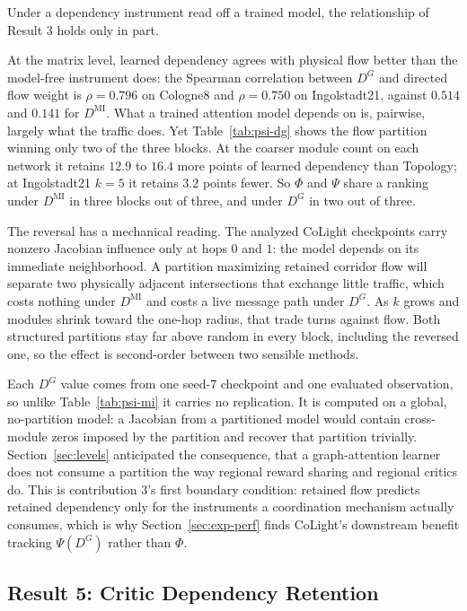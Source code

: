 \documentclass[journal]{IEEEtran}
\theoremstyle{definition}
\begin{document}
Under a dependency instrument read off a trained model, the relationship of Result 3 holds only in part.

At the matrix level, learned dependency agrees with physical flow better than the model-free instrument does: the Spearman correlation between $D^G$ and directed flow weight is $\rho=0.796$ on Cologne8 and $\rho=0.750$ on Ingolstadt21, against $0.514$ and $0.141$ for $D^{\mathrm{MI}}$.
What a trained attention model depends on is, pairwise, largely what the traffic does.
Yet Table~\ref{tab:psi-dg} shows the flow partition winning only two of the three blocks.
At the coarser module count on each network it retains $12.9$ to $16.4$ more points of learned dependency than Topology; at Ingolstadt21 $k=5$ it retains $3.2$ points fewer.
So $\Phi$ and $\Psi$ share a ranking under $D^{\mathrm{MI}}$ in three blocks out of three, and under $D^G$ in two out of three.

The reversal has a mechanical reading.
The analyzed CoLight checkpoints carry nonzero Jacobian influence only at hops $0$ and $1$: the model depends on its immediate neighborhood.
A partition maximizing retained corridor flow will separate two physically adjacent intersections that exchange little traffic, which costs nothing under $D^{\mathrm{MI}}$ and costs a live message path under $D^G$.
As $k$ grows and modules shrink toward the one-hop radius, that trade turns against flow.
Both structured partitions stay far above random in every block, including the reversed one, so the effect is second-order between two sensible methods.

Each $D^G$ value comes from one seed-7 checkpoint and one evaluated observation, so unlike Table~\ref{tab:psi-mi} it carries no replication.
It is computed on a global, no-partition model: a Jacobian from a partitioned model would contain cross-module zeros imposed by the partition and recover that partition trivially.
Section~\ref{sec:levels} anticipated the consequence, that a graph-attention learner does not consume a partition the way regional reward sharing and regional critics do.
This is contribution 3's first boundary condition: retained flow predicts retained dependency only for the instruments a coordination mechanism actually consumes, which is why Section~\ref{sec:exp-perf} finds CoLight's downstream benefit tracking $\Psi(D^G)$ rather than $\Phi$.

\subsection{Result 5: Critic Dependency Retention}
\label{sec:exp-dq}
\end{document}
